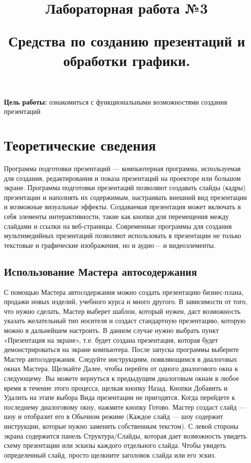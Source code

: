 \documentclass[a4paper]{article}
\title{\bfseries Лабораторная работа №3

Средства по созданию презентаций и обработки графики.}
\date{}
\begin{document}
\maketitle

\noindent\textbf{Цель работы: }ознакомиться с функциональными возможностями создания презентаций

\section{Теоретические сведения}

Программа подготовки презентаций — компьютерная программа, используемая для создания, редактирования и показа презентаций на проекторе или большом экране. Программа подготовки презентаций позволяют создавать слайды (кадры) презентации и наполнять их содержимым, настраивать внешний вид презентации и возможные визуальные эффекты. Создаваемая презентация может включать в себя элементы интерактивности, такие как кнопки для перемещения между слайдами и ссылки на веб-страницы. Современные программы для создания мультимедийных презентаций позволяют использовать в презентации не только текстовые и графические изображения, но и аудио--- и видеоэлементы.


\subsection{Использование Мастера автосодержания}
С помощью Мастера автосодержания можно создать презентацию бизнес-плана, продажи новых изделий, учебного курса и много другого. В зависимости от того, что нужно сделать, Мастер выберет шаблон, который нужен, даст возможность указать желательный тип но­сителя и создаст стандартную презентацию, которую можно в дальнейшем настроить. В данном случае нужно выбрать пункт «Презентация на экране», т.е. будет создана презентация, которая будет демонстрироваться на экране компьютера. После запуска программы  выберите Мастер автосодержания. Следуйте инструкциям, появляющимся в диалоговых окнах Мастера. Щелкайте Далее, чтобы перейти от одного диалогового окна к следующему. Вы можете вернуться к предыдущим диалоговым окнам в любое время в течение этого процесса, щел­кая кнопку Назад. Кнопки Добавить и Удалить на этапе выбора Вида презентации не пригодятся. Когда перейдете к последнему диалоговому окну, нажмите кнопку Готово. Мастер создаст слайд --- шоу и отобразит его в Обычном режиме (Каждое слайд --- шоу содержит инструкции, которые нужно заменить собственным текстом). С левой стороны экрана содержится панель Структура/Слайды, которая дает возможность увидеть схему презентации или эскизы каждого отдельного слайда. Чтобы увидеть определенный слайд, просто щелкните заголовок слайда или его эскиз.
\end{document}
